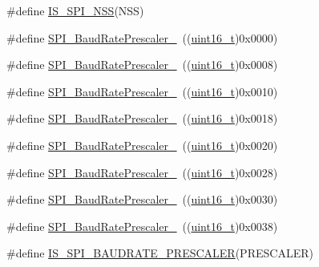 \begin{DoxyCompactItemize}
\item 
\#define \hyperlink{group___s_p_i___slave___select__management_gabbeedf42eccef1bae4f88c606fc3b261}{I\+S\+\_\+\+S\+P\+I\+\_\+\+N\+SS}(N\+SS)
\item 
\#define \hyperlink{group___s_p_i___baud_rate___prescaler_ga88cd6d416c87b382396dbf4c02e3bd4b}{S\+P\+I\+\_\+\+Baud\+Rate\+Prescaler\+\_}~((\hyperlink{_p_e___types_8h_a1f1825b69244eb3ad2c7165ddc99c956}{uint16\+\_\+t})0x0000)
\item 
\#define \hyperlink{group___s_p_i___baud_rate___prescaler_ga17ac4858cb9387289ee7c3d94a9b54be}{S\+P\+I\+\_\+\+Baud\+Rate\+Prescaler\+\_}~((\hyperlink{_p_e___types_8h_a1f1825b69244eb3ad2c7165ddc99c956}{uint16\+\_\+t})0x0008)
\item 
\#define \hyperlink{group___s_p_i___baud_rate___prescaler_ga023a1e4c04586f2feb0d4b03b2e0c230}{S\+P\+I\+\_\+\+Baud\+Rate\+Prescaler\+\_}~((\hyperlink{_p_e___types_8h_a1f1825b69244eb3ad2c7165ddc99c956}{uint16\+\_\+t})0x0010)
\item 
\#define \hyperlink{group___s_p_i___baud_rate___prescaler_ga5ef8587bb96e3ec98e9fde770756fc7d}{S\+P\+I\+\_\+\+Baud\+Rate\+Prescaler\+\_}~((\hyperlink{_p_e___types_8h_a1f1825b69244eb3ad2c7165ddc99c956}{uint16\+\_\+t})0x0018)
\item 
\#define \hyperlink{group___s_p_i___baud_rate___prescaler_ga1d30cecaa412cee5250c69644207c652}{S\+P\+I\+\_\+\+Baud\+Rate\+Prescaler\+\_}~((\hyperlink{_p_e___types_8h_a1f1825b69244eb3ad2c7165ddc99c956}{uint16\+\_\+t})0x0020)
\item 
\#define \hyperlink{group___s_p_i___baud_rate___prescaler_ga2c9cd96ed56432a83f8e4f46fbecb5e6}{S\+P\+I\+\_\+\+Baud\+Rate\+Prescaler\+\_}~((\hyperlink{_p_e___types_8h_a1f1825b69244eb3ad2c7165ddc99c956}{uint16\+\_\+t})0x0028)
\item 
\#define \hyperlink{group___s_p_i___baud_rate___prescaler_gafa6c39c3ee16a08730356a5cd30f3648}{S\+P\+I\+\_\+\+Baud\+Rate\+Prescaler\+\_}~((\hyperlink{_p_e___types_8h_a1f1825b69244eb3ad2c7165ddc99c956}{uint16\+\_\+t})0x0030)
\item 
\#define \hyperlink{group___s_p_i___baud_rate___prescaler_ga1e1aa6406f0e88ac557ba49fb8069e3e}{S\+P\+I\+\_\+\+Baud\+Rate\+Prescaler\+\_}~((\hyperlink{_p_e___types_8h_a1f1825b69244eb3ad2c7165ddc99c956}{uint16\+\_\+t})0x0038)
\item 
\#define \hyperlink{group___s_p_i___baud_rate___prescaler_gae79f46ed9f91e39dc1f6912cb25fc716}{I\+S\+\_\+\+S\+P\+I\+\_\+\+B\+A\+U\+D\+R\+A\+T\+E\+\_\+\+P\+R\+E\+S\+C\+A\+L\+ER}(P\+R\+E\+S\+C\+A\+L\+ER)

\end{DoxyCompactItemize}
